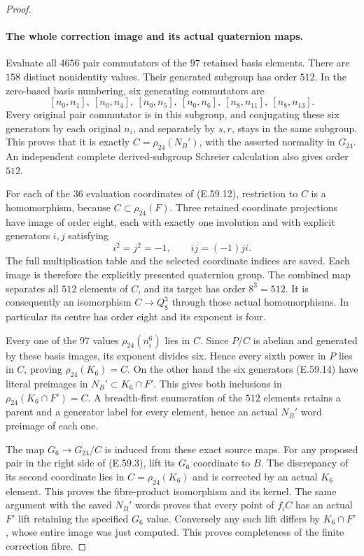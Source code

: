 \begin{proof}
\paragraph{The whole correction image and its actual quaternion maps.}
Evaluate all $4656$ pair commutators of the $97$ retained basis
elements. There are $158$ distinct nonidentity values. Their generated
subgroup has order $512$. In the zero-based basis numbering, six
generating commutators are
\[
 [n_0,n_1],\ [n_0,n_4],\ [n_0,n_5],\ [n_0,n_6],\
 [n_8,n_{11}],\ [n_8,n_{13}].
 \tag{E.59.14}
\]
Every original pair commutator is in this subgroup, and conjugating
these six generators by each original $n_i$, and separately by
$s,r$, stays in the same subgroup. This proves that it is exactly
$C=\rho_{24}(N_B')$, with the asserted normality in $G_{24}$.
An independent complete derived-subgroup Schreier calculation also
gives order $512$.

For each of the $36$ evaluation coordinates of
\textup{(E.59.12)}, restriction to $C$ is a homomorphism, because
$C\subset\rho_{24}(F)$. Three retained coordinate projections have
image of order eight, each with exactly one involution and with
explicit generators $i,j$ satisfying
\[
             i^2=j^2=-1,\qquad ij=(-1)ji.
 \tag{E.59.15}
\]
The full multiplication table and the selected coordinate indices
are saved. Each image is therefore the explicitly presented
quaternion group. The combined map separates all $512$ elements
of $C$, and its target has order $8^3=512$. It is consequently
an isomorphism $C\to Q_8^3$ through those actual homomorphisms.
In particular its centre has order eight and its exponent is four.

Every one of the $97$ values $\rho_{24}(n_i^6)$ lies in $C$.
Since $P/C$ is abelian and generated by these basis images, its
exponent divides six. Hence every sixth power in $P$ lies in $C$,
proving $\rho_{24}(K_6)=C$. On the other hand the six generators
\textup{(E.59.14)} have literal preimages in $N_B'\subset K_6\cap F'$.
This gives both inclusions in
$\rho_{24}(K_6\cap F')=C$. A breadth-first enumeration of the
$512$ elements retains a parent and a generator label for every
element, hence an actual $N_B'$ word preimage of each one.

The map $G_6\to G_{24}/C$ is induced from these exact source maps.
For any proposed pair in the right side of \textup{(E.59.3)}, lift
its $G_6$ coordinate to $B$. The discrepancy of its second coordinate
lies in $C=\rho_{24}(K_6)$ and is corrected by an actual $K_6$
element. This proves the fibre-product isomorphism and its kernel.
The same argument with the saved $N_B'$ words proves that every
point of $f_iC$ has an actual $F'$ lift retaining the specified
$G_6$ value. Conversely any such lift differs by $K_6\cap F'$,
whose entire image was just computed. This proves completeness
of the finite correction fibre.


\end{proof}
